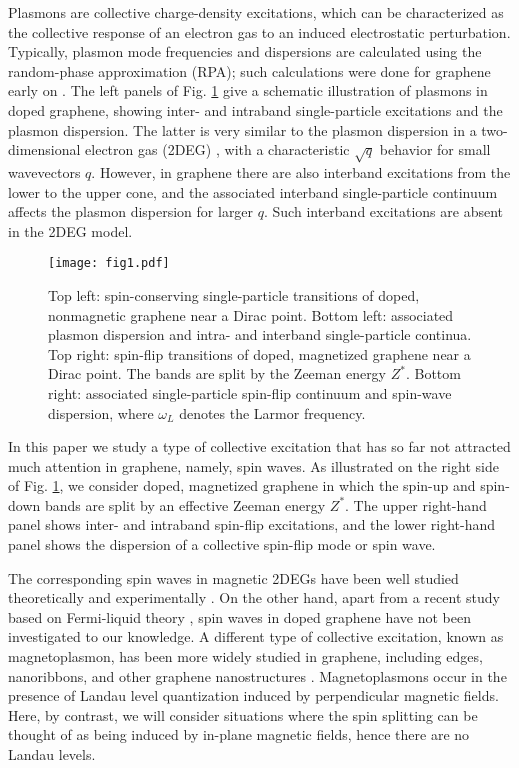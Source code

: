 \documentclass[aps,prb,twocolumn,superscriptaddress]{revtex4-2}
\begin{document}
Plasmons are collective charge-density excitations, which can be characterized as the collective response of an electron gas
to an induced electrostatic perturbation. Typically, plasmon mode frequencies and dispersions are calculated using the random-phase approximation (RPA);
such calculations were done for graphene early on \cite{Wunsch2006,Hwang2007,Abedinpour2011,Stauber2014,Agarwal2015}.
The left panels of Fig. \ref{fig1} give a schematic illustration of plasmons in doped graphene, showing inter- and intraband single-particle excitations
and the plasmon dispersion. The latter is very similar to the plasmon dispersion in a two-dimensional electron gas (2DEG) \cite{GiulianiVignale}, with a  characteristic
$\sqrt{q}$ behavior for small wavevectors $q$. However, in graphene there are also interband excitations
from the lower to the upper cone, and the associated interband single-particle continuum affects the plasmon dispersion for larger $q$.
Such interband excitations are absent in the 2DEG model.

\begin{figure}
  \texttt{[image: fig1.pdf]}
  \caption{Top left: spin-conserving single-particle transitions of doped, nonmagnetic graphene near a Dirac point.
  Bottom left: associated plasmon dispersion and intra- and interband single-particle continua.
  Top right: spin-flip transitions of doped, magnetized graphene near a Dirac point. The bands are split by the Zeeman energy $Z^*$.
  Bottom right: associated single-particle spin-flip continuum and spin-wave dispersion, where $\omega_L$ denotes the Larmor frequency. }
  \label{fig1}
\end{figure}

In this paper we study a type of collective excitation that has so far not attracted much attention in graphene, namely, spin waves.
As illustrated on the right side of Fig. \ref{fig1}, we consider doped, magnetized graphene in which the spin-up and spin-down bands are split
by an effective Zeeman energy $Z^*$. The upper right-hand panel shows inter- and intraband spin-flip excitations, and the lower right-hand panel shows
the dispersion of a collective spin-flip mode or spin wave.

The corresponding spin waves in magnetic 2DEGs have been well studied theoretically and experimentally \cite{Jusserand1992,Jusserand1993,Perez2007,Perez2009,Baboux2012,Baboux2013,Perez2016,Karimi2017,DAmico2019,Maiti2015a,Maiti2015b,Maiti2016,Maiti2017,Kung2017}.
On the other hand, apart from a recent study based on Fermi-liquid theory \cite{Raines2021}, spin waves in doped graphene have not been investigated to our knowledge.
A different type of collective excitation, known as magnetoplasmon, has been more widely studied in graphene, including edges, nanoribbons, and other graphene nanostructures
\cite{Roldan2010,Pyatkovskiy2011,Balev2011,Culchac2012,Wang2012,Crassee2012,Jin2016,Sokolik2019,Jiao2021}. Magnetoplasmons occur in the presence
of Landau level quantization induced by perpendicular magnetic fields. Here, by contrast, we will consider situations where the spin splitting
can be thought of as being induced by in-plane magnetic fields, hence there are no Landau levels.
\end{document}
